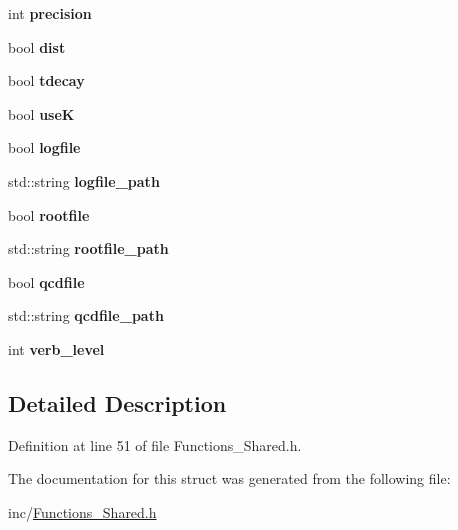 \begin{DoxyCompactItemize}
\item 
\hypertarget{structopt_ad36cc92ecbf8b2bc1deabde5268e9267}{}int {\bfseries precision}\label{structopt_ad36cc92ecbf8b2bc1deabde5268e9267}

\item 
\hypertarget{structopt_acd1b95ec5257a323cd3eb454c7ccd885}{}bool {\bfseries dist}\label{structopt_acd1b95ec5257a323cd3eb454c7ccd885}

\item 
\hypertarget{structopt_aedbcd7fea16a0fa968a1d75884fc0a4c}{}bool {\bfseries tdecay}\label{structopt_aedbcd7fea16a0fa968a1d75884fc0a4c}

\item 
\hypertarget{structopt_a96bb92ceb1c74fa871222c57eb4081bd}{}bool {\bfseries use\+K}\label{structopt_a96bb92ceb1c74fa871222c57eb4081bd}

\item 
\hypertarget{structopt_af0867351f5c3fd59d3cc5136cf423fc9}{}bool {\bfseries logfile}\label{structopt_af0867351f5c3fd59d3cc5136cf423fc9}

\item 
\hypertarget{structopt_a439a22fd4b6948db4a8f08cad4c6bae9}{}std\+::string {\bfseries logfile\+\_\+path}\label{structopt_a439a22fd4b6948db4a8f08cad4c6bae9}

\item 
\hypertarget{structopt_a8d7af1ad473a324bd3633c7ef412c3fc}{}bool {\bfseries rootfile}\label{structopt_a8d7af1ad473a324bd3633c7ef412c3fc}

\item 
\hypertarget{structopt_ad8f1cc9a38cb142134fe5e063da388c0}{}std\+::string {\bfseries rootfile\+\_\+path}\label{structopt_ad8f1cc9a38cb142134fe5e063da388c0}

\item 
\hypertarget{structopt_aa03a2f557fa00f26b2e836ceddffabcd}{}bool {\bfseries qcdfile}\label{structopt_aa03a2f557fa00f26b2e836ceddffabcd}

\item 
\hypertarget{structopt_a22b6a3a9c090de3dd6ab73144e0c1bc9}{}std\+::string {\bfseries qcdfile\+\_\+path}\label{structopt_a22b6a3a9c090de3dd6ab73144e0c1bc9}

\item 
\hypertarget{structopt_abe0f9e730fd8eb6b107169359c859a3d}{}int {\bfseries verb\+\_\+level}\label{structopt_abe0f9e730fd8eb6b107169359c859a3d}

\end{DoxyCompactItemize}


\subsection{Detailed Description}


Definition at line 51 of file Functions\+\_\+\+Shared.\+h.



The documentation for this struct was generated from the following file\+:\begin{DoxyCompactItemize}
\item 
inc/\hyperlink{Functions__Shared_8h}{Functions\+\_\+\+Shared.\+h}\end{DoxyCompactItemize}

